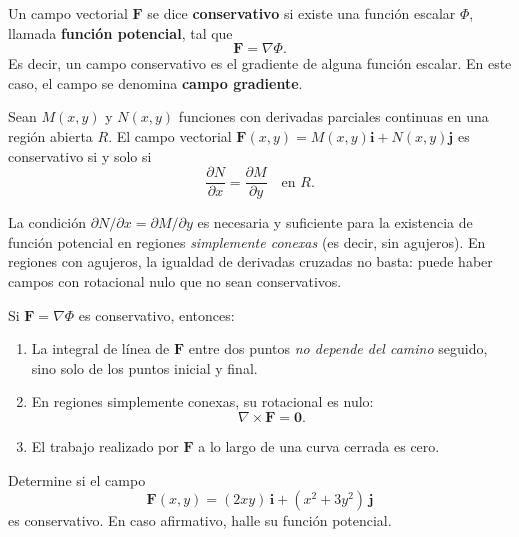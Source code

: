 Un campo vectorial \(\mathbf{F}\) se dice \textbf{conservativo} si
existe una función escalar \(\Phi\), llamada \textbf{función
potencial}, tal que
\[
\mathbf{F} = \nabla \Phi.
\]
Es decir, un campo conservativo es el gradiente de alguna función
escalar. En este caso, el campo se denomina \textbf{campo gradiente}.

\begin{theorem}
Sean \(M(x,y)\) y \(N(x,y)\) funciones con derivadas parciales continuas
en una región abierta \(R\). El campo vectorial
\(\mathbf{F}(x,y) = M(x,y)\mathbf{i} + N(x,y)\mathbf{j}\) es
conservativo si y solo si
\[
\frac{\partial N}{\partial x} = \frac{\partial M}{\partial y}
\quad \text{en } R.
\]
\end{theorem}

\begin{rem}
La condición \(\partial N/\partial x = \partial M/\partial y\) es
necesaria y suficiente para la existencia de función potencial en
regiones \emph{simplemente conexas} (es decir, sin agujeros). En
regiones con agujeros, la igualdad de derivadas cruzadas no basta:
puede haber campos con rotacional nulo que no sean conservativos.
\end{rem}

\begin{rem}
Si \(\mathbf{F} = \nabla \Phi\) es conservativo, entonces:
\begin{enumerate}
  \item La integral de línea de \(\mathbf{F}\) entre dos puntos
  \emph{no depende del camino} seguido, sino solo de los puntos
  inicial y final.
  \item En regiones simplemente conexas, su rotacional es nulo:
  \[
  \nabla \times \mathbf{F} = \mathbf{0}.
  \]
  \item El trabajo realizado por \(\mathbf{F}\) a lo largo de una
  curva cerrada es cero.
\end{enumerate}
\end{rem}

\begin{example}
Determine si el campo
\[
\mathbf{F}(x,y) = (2x y)\,\mathbf{i} + (x^2 + 3y^2)\,\mathbf{j}
\]
es conservativo. En caso afirmativo, halle su función potencial.
\end{example}

